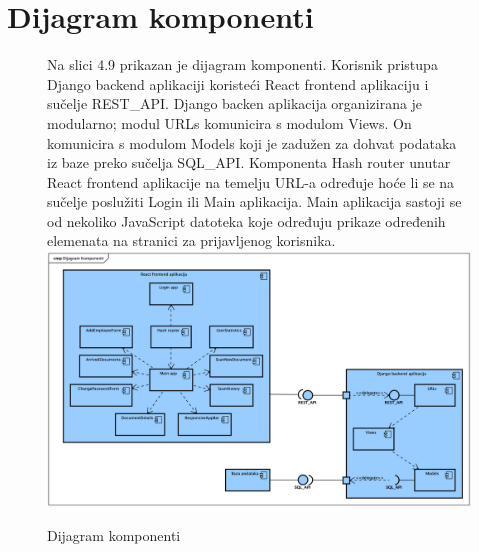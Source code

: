 			\eject

		\section{Dijagram komponenti}
		
			\begin{figure}[H]
				Na slici 4.9 prikazan je dijagram komponenti. Korisnik pristupa Django backend aplikaciji koristeći React frontend aplikaciju i sučelje REST_API. Django
				backen aplikacija organizirana je modularno; modul URLs komunicira s modulom Views. On komunicira s modulom Models koji je zadužen za dohvat podataka iz
				baze preko sučelja SQL_API. Komponenta Hash router unutar React frontend aplikacije na temelju URL-a određuje hoće li se na sučelje poslužiti Login ili
				Main aplikacija. Main aplikacija sastoji se od nekoliko JavaScript datoteka koje određuju prikaze određenih elemenata na stranici za prijavljenog korisnika.
				\newline
				\includegraphics[width=\textwidth]{slike/Component.png}
				\caption{Dijagram komponenti}
				\label{fig:Component}
			\end{figure}